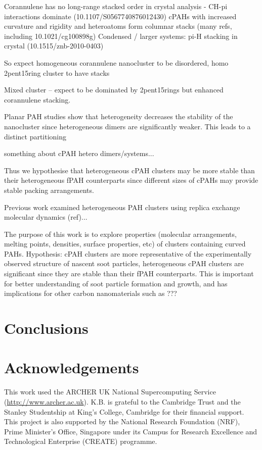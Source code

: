 Corannulene has no long-range stacked order in crystal analysis  - CH-pi interactions dominate (10.1107/S0567740876012430)
cPAHs with increased curvature and rigidity and heteroatoms form columnar stacks (many refs, including 10.1021/cg100898g)
Condensed / larger systems: pi-H stacking in crystal (10.1515/znb-2010-0403) 

So expect homogeneous corannulene nanocluster to be disordered, homo 2pent15ring cluster to have stacks

Mixed cluster – expect to be dominated by 2pent15rings but enhanced corannulene stacking.


Planar PAH studies show that heterogeneity decreases the stability of the nanocluster since heterogeneous dimers are significantly weaker.  This leads to a distinct partitioning 

something about cPAH hetero dimers/systems...

Thus we hypothesise that heterogeneous cPAH clusters may be more stable than their heterogeneous fPAH counterparts since different sizes of cPAHs may provide stable packing arrangements.





Previous work examined heterogeneous PAH clusters using replica exchange molecular dynamics (ref)...

The purpose of this work is to explore properties (molecular arrangements, melting points, densities, surface properties, etc) of clusters containing curved PAHs.  
Hypothesis: cPAH clusters are more representative of the experimentally observed structure of nascent soot particles, heterogeneous cPAH clusters are significant since they are stable than their fPAH counterparts.
This is important for better understanding of soot particle formation and growth, and has implications for other carbon nanomaterials such as ???

%
\section{Conclusions}


\section*{Acknowledgements}
This work used the ARCHER UK National Supercomputing Service (\url{http://www.archer.ac.uk}).
K.B. is grateful to the Cambridge Trust and the Stanley Studentship at King's College, Cambridge for their financial support.
This project is also supported by the National Research Foundation (NRF), Prime Minister's Office, Singapore under its Campus for Research Excellence and Technological Enterprise (CREATE) programme.
